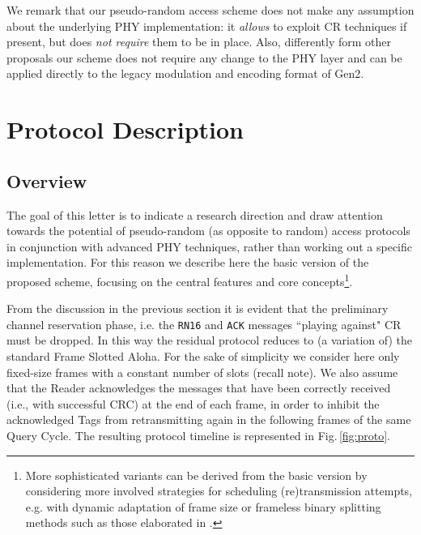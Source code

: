 \documentclass[12pt,draftcls,onecolumn]{IEEEtran}
\begin{document}
We remark that our pseudo-random access scheme  does not make any assumption about the underlying PHY implementation: it \emph{allows} to exploit CR techniques if present,  but does \emph{not require} them to be in place. Also, differently form other proposals \cite{cassini07} our scheme does not require any change to the PHY layer and can be applied directly to the legacy modulation and encoding format of Gen2.











\section{Protocol Description}\label{sec:scenario}
\subsection{Overview}


The goal of this letter is to indicate a research direction and draw attention towards the potential of pseudo-random (as opposite to random) access protocols in conjunction with advanced PHY techniques,  rather than working out a specific implementation.  For this reason we describe here the basic version of the proposed scheme, focusing on the central features and core concepts\footnote{
More sophisticated variants can be derived from the basic version by considering more involved strategies for scheduling (re)transmission attempts, e.g. with dynamic adaptation of frame size or frameless binary splitting methods such as those elaborated in \cite{binarytree}.}.

From the discussion in the previous section it is evident that the preliminary channel reservation phase, i.e. the \texttt{RN16} and \texttt{ACK} messages  ``playing against" CR must be dropped. In this way the residual protocol reduces to (a variation of) the standard Frame Slotted Aloha.
For the sake of simplicity  we consider here only fixed-size frames with a constant number of slots (recall note).
We also assume that the Reader acknowledges the messages that have been correctly received (i.e., with successful CRC) at the end of each frame,
in order to inhibit  the acknowledged Tags from retransmitting again in the following frames of the same Query Cycle.
The resulting protocol timeline is represented in Fig.\,\ref{fig:proto}.
\end{document}
